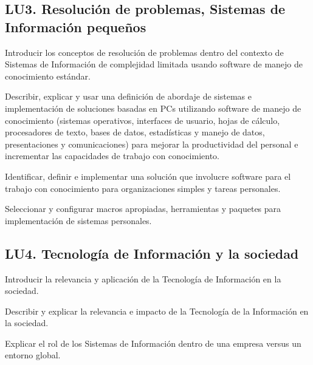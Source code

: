 \subsection{LU3. Resolución de problemas, Sistemas de Información pequeños}\label{sec:LU3}
\begin{LearningUnit}
\begin{LUGoal}
\item Introducir los conceptos de resolución de problemas dentro del contexto de Sistemas de Información de complejidad limitada usando software de manejo de conocimiento estándar.
\end{LUGoal}

\begin{LUObjective}
\item Describir, explicar y usar una definición de abordaje de sistemas e implementación de soluciones basadas en PCs utilizando software de manejo de conocimiento (sistemas operativos, interfaces de usuario, hojas de cálculo, procesadores de texto, bases de datos, estadísticas y manejo de datos, presentaciones y comunicaciones) para mejorar la productividad del personal e incrementar las capacidades de trabajo con conocimiento.
\item Identificar, definir e implementar una solución que involucre software para el trabajo con conocimiento para organizaciones simples y tareas personales.
\item Seleccionar y configurar macros apropiadas, herramientas y paquetes para implementación de sistemas personales.
\end{LUObjective}
\end{LearningUnit}

\subsection{LU4. Tecnología de Información y la sociedad}\label{sec:LU4}
\begin{LearningUnit}
\begin{LUGoal}
\item Introducir la relevancia y aplicación de la Tecnología de Información en la sociedad.
\end{LUGoal}

\begin{LUObjective}
\item Describir y explicar la relevancia e impacto de la Tecnología de la Información en la sociedad.
\item Explicar el rol de los Sistemas de Información dentro de una empresa versus un entorno global.
\end{LUObjective}
\end{LearningUnit}

